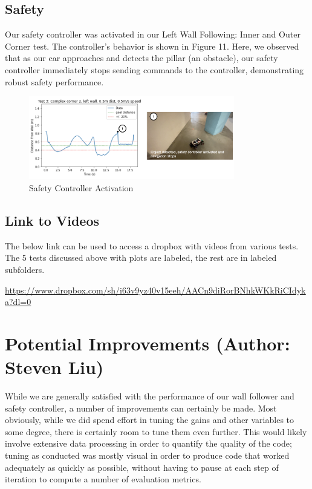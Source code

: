 \documentclass{article}
\begin{document}
\subsection{Safety}
Our safety controller was activated in our Left Wall Following: Inner and Outer Corner test. The controller's behavior is shown in Figure 11. Here, we observed that as our car approaches and detects the pillar (an obstacle), our safety controller immediately stops sending commands to the controller, demonstrating robust safety performance.

\begin{figure}[H]
\begin{center}
\includegraphics[width=0.8\textwidth]{safety_figure.png} %
\caption{Safety Controller Activation}
\end{center}
\label{workflow}
\end{figure}

\subsection{Link to Videos}

The below link can be used to access a dropbox with videos from various tests. The 5 tests discussed above with plots are labeled, the rest are in labeled subfolders. 
\begin{center} \href{https://www.dropbox.com/sh/i63v9yz40v15eeh/AACn9diRorBNhkWKkRiCIdyka?dl=0}{\underline{https://www.dropbox.com/sh/i63v9yz40v15eeh/AACn9diRorBNhkWKkRiCIdyka?dl=0}}
\end{center}

\section{Potential Improvements (Author: Steven Liu)}

While we are generally satisfied with the performance of our wall follower and safety controller, a number of improvements can certainly be made. Most obviously, while we did spend effort in tuning the gains and other variables to some degree, there is certainly room to tune them even further. This would likely involve extensive data processing in order to quantify the quality of the code; tuning as conducted was mostly visual in order to produce code that worked adequately as quickly as possible, without having to pause at each step of iteration to compute a number of evaluation metrics. \\
\end{document}
